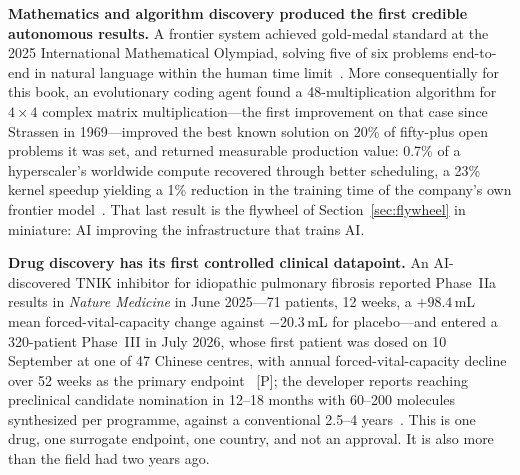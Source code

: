 \textbf{Mathematics and algorithm discovery produced the first credible autonomous results.} A frontier system achieved gold-medal standard at the 2025 International Mathematical Olympiad, solving five of six problems end-to-end in natural language within the human time limit~\cite{imo-gold}. More consequentially for this book, an evolutionary coding agent found a 48-multiplication algorithm for $4\times4$ complex matrix multiplication---the first improvement on that case since Strassen in 1969---improved the best known solution on 20\% of fifty-plus open problems it was set, and returned measurable production value: 0.7\% of a hyperscaler's worldwide compute recovered through better scheduling, a 23\% kernel speedup yielding a 1\% reduction in the training time of the company's own frontier model~\cite{alphaevolve}. That last result is the flywheel of Section~\ref{sec:flywheel} in miniature: AI improving the infrastructure that trains AI.

\textbf{Drug discovery has its first controlled clinical datapoint.} An AI-discovered TNIK inhibitor for idiopathic pulmonary fibrosis reported Phase~IIa results in \emph{Nature Medicine} in June 2025---71 patients, 12 weeks, a $+98.4$\,mL mean forced-vital-capacity change against $-20.3$\,mL for placebo---and entered a 320-patient Phase~III in July 2026, whose first patient was dosed on 10 September at one of 47 Chinese centres, with annual forced-vital-capacity decline over 52 weeks as the primary endpoint~\cite{sci-insilico-dosing} [P]; the developer reports reaching preclinical candidate nomination in 12--18 months with 60--200 molecules synthesized per programme, against a conventional 2.5--4 years~\cite{rentosertib,rentosertib-p3}. This is one drug, one surrogate endpoint, one country, and not an approval. It is also more than the field had two years ago.


